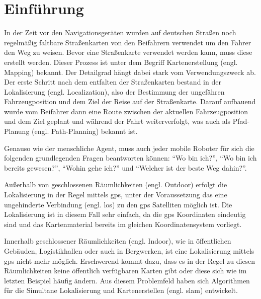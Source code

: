 \chapter{Einführung}

In der Zeit vor den Navigationsgeräten wurden auf deutschen Straßen noch regelmäßig faltbare Straßenkarten von den Beifahrern verwendet um den Fahrer den Weg zu weisen. Bevor eine Straßenkarte verwendet werden kann, muss diese erstellt werden. Dieser Prozess ist unter dem Begriff Kartenerstellung (engl. Mapping) bekannt. Der Detailgrad hängt dabei stark vom Verwendungszweck ab. Der erste Schritt nach dem entfalten der Straßenkarten bestand in der Lokalisierung (engl. Localization), also der Bestimmung der ungefähren Fahrzeugposition und dem Ziel der Reise auf der Straßenkarte. Darauf aufbauend wurde vom Beifahrer dann eine Route zwischen der aktuellen Fahrzeugposition und dem Ziel geplant und während der Fahrt weiterverfolgt, was auch als Pfad-Planung (engl. Path-Planning) bekannt ist.

Genauso wie der menschliche Agent, muss auch jeder mobile Roboter für sich die folgenden grundlegenden Fragen beantworten können: \enquote{Wo bin ich?}, \enquote{Wo bin ich bereits gewesen?}, \enquote{Wohin gehe ich?} und \enquote{Welcher ist der beste Weg dahin?}. \cite{murphy2000introduction}

Außerhalb von geschlossenen Räumlichkeiten (engl. Outdoor) erfolgt die Lokalisierung in der Regel mittels \gls{gps}, unter der Voraussetzung das eine ungehinderte Verbindung (engl. \gls{los}) zu den \gls{gps} Satelliten möglich ist. Die Lokalisierung ist in diesem Fall sehr einfach, da die \gls{gps} Koordinaten eindeutig sind und das Kartenmaterial bereits im gleichen Koordinatensystem vorliegt.

Innerhalb geschlossener Räumlichkeiten (engl. Indoor), wie in öffentlichen Gebäuden, Logistikhallen oder auch in Bergwerken, ist eine Lokalisierung mittels \gls{gps} nicht mehr möglich. Erschwerend kommt dazu, dass es in der Regel zu diesen Räumlichkeiten keine öffentlich verfügbaren Karten gibt oder diese sich wie im letzten Beispiel häufig ändern. Aus diesem Problemfeld haben sich Algorithmen für die Simultane Lokalisierung und Kartenerstellen (engl. \Gls{slam}) entwickelt.

